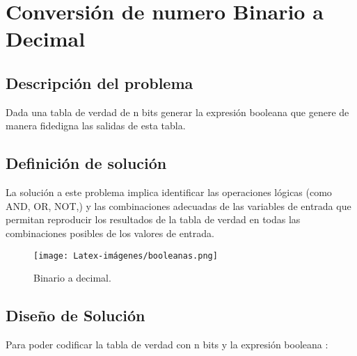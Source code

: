 \section{Conversión de numero Binario a Decimal}

\subsection{Descripción del problema}

Dada una tabla de verdad de n bits generar la expresión booleana que genere de manera fidedigna las salidas de esta tabla. 

\subsection{Definición  de solución}

La solución a este problema implica identificar las operaciones lógicas (como AND, OR, NOT,) y las combinaciones adecuadas de las variables de entrada que permitan reproducir los resultados de la tabla de verdad en todas las combinaciones posibles de los valores de entrada.

\begin {figure}[h!]
\centerline{\texttt{[image: Latex-imágenes/booleanas.png]}}
\caption{Binario a decimal.}
\label{fig}
\end {figure}

\subsection{Diseño de Solución}

Para poder codificar la  tabla de verdad  con n bits y la expresión booleana :

